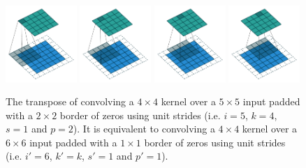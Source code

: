 \documentclass{report}
\begin{document}
\begin{figure}[p]
    \centering
    \includegraphics[width=0.24\textwidth]{pdf/arbitrary_padding_no_strides_transposed_00.pdf}
    \includegraphics[width=0.24\textwidth]{pdf/arbitrary_padding_no_strides_transposed_01.pdf}
    \includegraphics[width=0.24\textwidth]{pdf/arbitrary_padding_no_strides_transposed_02.pdf}
    \includegraphics[width=0.24\textwidth]{pdf/arbitrary_padding_no_strides_transposed_03.pdf}
    \caption{\label{fig:arbitrary_padding_no_strides_transposed} The transpose
        of convolving a $4 \times 4$ kernel over a $5 \times 5$ input padded
        with a $2 \times 2$ border of zeros using unit strides (i.e. $i = 5$,
        $k = 4$, $s = 1$ and $p = 2$). It is equivalent to convolving a $4
        \times 4$ kernel over a $6 \times 6$ input padded with a $1 \times 1$
        border of zeros using unit strides (i.e. $i' = 6$, $k' = k$, $s' = 1$
        and $p' = 1$).}
\end{figure}
\end{document}
